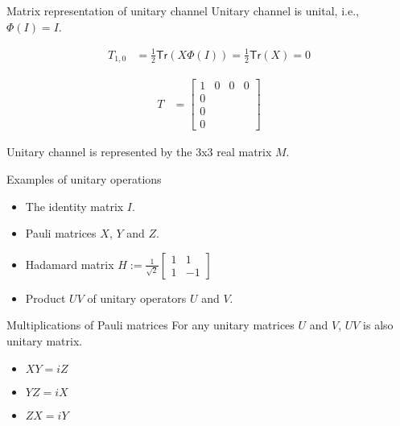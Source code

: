 \documentclass{beamer}
\newcommand{\Tr}{\mathsf{Tr}}
\newcommand\emm[1]{\textcolor{redorange}{{#1}}}
\begin{document}
\begin{frame}{Matrix representation of unitary channel}
Unitary channel is \emm{unital}, i.e., $\Phi(I) = I$.

\begin{align*}
T_{1,0} &= \frac12\Tr(X\Phi(I)) = \frac12\Tr(X) = 0
\end{align*}

\begin{align*}
T &=
\begin{bmatrix}
1&0&0&0\\
0&\\
0&\\
0
\end{bmatrix}
\end{align*}

Unitary channel is represented by the 3x3 real matrix $M$.
\end{frame}

\begin{frame}{Examples of unitary operations}
\begin{itemize}
\setlength{\itemsep}{2em}
\item The identity matrix $I$.
\item Pauli matrices $X$, $Y$ and $Z$.
\item Hadamard matrix $H:=\frac1{\sqrt{2}}\begin{bmatrix}1&1\\1&-1\end{bmatrix}$
\item Product $UV$ of unitary operators $U$ and $V$.
\end{itemize}
\end{frame}

\begin{frame}{Multiplications of Pauli matrices}
For any unitary matrices $U$ and $V$, $UV$ is also unitary matrix.

\vspace{2em}
\begin{itemize}
\setlength{\itemsep}{2em}
\item $XY=iZ$
\item $YZ=iX$
\item $ZX=iY$
\end{itemize}
\end{frame}
\end{document}
